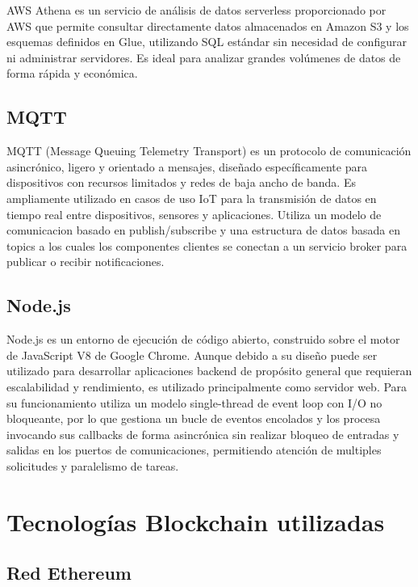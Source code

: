 AWS Athena es un servicio de análisis de datos serverless proporcionado por AWS que permite consultar directamente datos almacenados en Amazon S3 y los esquemas definidos en Glue, utilizando SQL estándar sin necesidad de configurar ni administrar servidores. Es ideal para analizar grandes volúmenes de datos de forma rápida y económica.



\subsection{MQTT}

MQTT (Message Queuing Telemetry Transport) es un protocolo de comunicación asincrónico, ligero y orientado a mensajes, diseñado específicamente para dispositivos con recursos limitados y redes de baja ancho de banda. Es ampliamente utilizado en casos de uso IoT para la transmisión de datos en tiempo real entre dispositivos, sensores y aplicaciones. Utiliza un modelo de comunicacion basado en publish/subscribe y una estructura de datos basada en topics a los cuales los componentes clientes se conectan a un servicio broker para publicar o recibir notificaciones. 




\subsection{Node.js}

Node.js es un entorno de ejecución de código abierto, construido sobre el motor de JavaScript V8 de Google Chrome. Aunque debido a su diseño puede ser utilizado para desarrollar aplicaciones backend de propósito general que requieran escalabilidad y rendimiento, es utilizado principalmente como servidor web. Para su funcionamiento utiliza un modelo single-thread de event loop con I/O no bloqueante, por lo que gestiona un bucle de eventos encolados y los procesa invocando sus callbacks de forma asincrónica sin realizar bloqueo de entradas y salidas en los puertos de comunicaciones, permitiendo atención de multiples solicitudes y paralelismo de tareas.

\section{Tecnologías Blockchain utilizadas}


\subsection{Red Ethereum}

